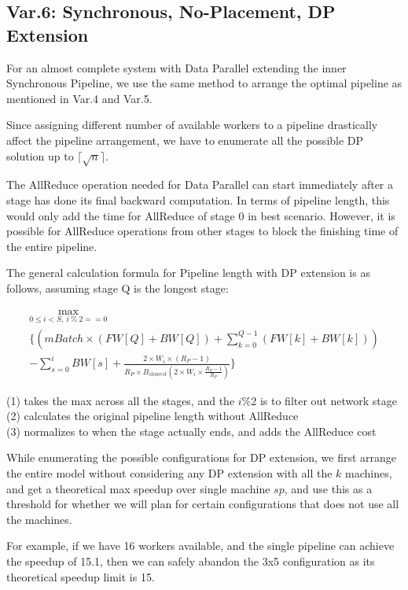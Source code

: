 \documentclass[12pt,letterpaper]{article}
\begin{document}
\subsection{Var.6: Synchronous, No-Placement, DP Extension}
For an almost complete system with Data Parallel extending the inner Synchronous Pipeline, we use the same method to arrange the optimal pipeline as mentioned in Var.4 and Var.5.

Since assigning different number of available workers to a pipeline drastically affect the pipeline arrangement, we have to enumerate all the possible DP solution up to $\lceil\sqrt{n}\rceil$.

The AllReduce operation needed for Data Parallel can start immediately after a stage has done its final backward computation. In terms of pipeline length, this would only add the time for AllReduce of stage 0 in best scenario. However, it is possible for AllReduce operations from other stages to block the finishing time of the entire pipeline.

The general calculation formula for Pipeline length with DP extension is as follows, assuming stage Q is the longest stage:

\begin{gather}
	\max_{0 \le i < S,\ i\ \%\ 2 == 0} \\\{
        	(mBatch \times (FW[Q] + BW[Q]) + \sum_{k=0}^{Q-1}{(FW[k] + BW[k])}) \\- \sum_{s=0}^i BW[s] + \frac{2 \times W_i \times (R_P-1)}{R_P \times B_{slowest}(2 \times W_i \times \frac{R_P-1}{R_P})} \}
\end{gather}

(1) takes the max across all the stages, and the $i \% 2$ is to filter out network stage \\
(2) calculates the original pipeline length without AllReduce \\
(3) normalizes to when the stage actually ends, and adds the AllReduce cost

While enumerating the possible configurations for DP extension, we first arrange the entire model without considering any DP extension with all the $k$ machines, and get a theoretical max speedup over single machine $sp$, and use this as a threshold for whether we will plan for certain configurations that does not use all the machines. 

For example, if we have 16 workers available, and the single pipeline can achieve the speedup of 15.1, then we can safely abandon the 3x5 configuration as its theoretical speedup limit is 15.
\end{document}
